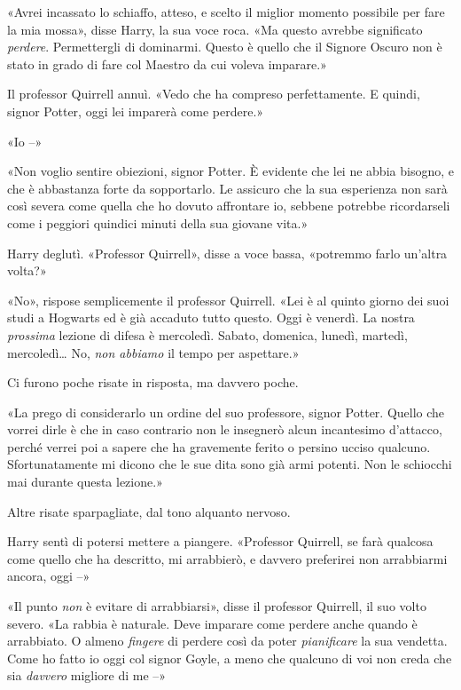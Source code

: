 «Avrei incassato lo schiaffo, atteso, e scelto il miglior momento possibile per fare la mia mossa», disse Harry, la sua voce roca. «Ma questo avrebbe significato \textit{perdere}. Permettergli di dominarmi. Questo è quello che il Signore Oscuro non è stato in grado di fare col Maestro da cui voleva imparare.»

Il professor Quirrell annuì. «Vedo che ha compreso perfettamente. E quindi, signor Potter, oggi lei imparerà come perdere.»

«Io –»

«Non voglio sentire obiezioni, signor Potter. È evidente che lei ne abbia bisogno, e che è abbastanza forte da sopportarlo. Le assicuro che la sua esperienza non sarà così severa come quella che ho dovuto affrontare io, sebbene potrebbe ricordarseli come i peggiori quindici minuti della sua giovane vita.»

Harry deglutì. «Professor Quirrell», disse a voce bassa, «potremmo farlo un’altra volta?»

«No», rispose semplicemente il professor Quirrell. «Lei è al quinto giorno dei suoi studi a Hogwarts ed è già accaduto tutto questo. Oggi è venerdì. La nostra \textit{prossima} lezione di difesa è mercoledì. Sabato, domenica, lunedì, martedì, mercoledì… No, \textit{non abbiamo} il tempo per aspettare.»

Ci furono poche risate in risposta, ma davvero poche.

«La prego di considerarlo un ordine del suo professore, signor Potter. Quello che vorrei dirle è che in caso contrario non le insegnerò alcun incantesimo d’attacco, perché verrei poi a sapere che ha gravemente ferito o persino ucciso qualcuno. Sfortunatamente mi dicono che le sue dita sono già armi potenti. Non le schiocchi mai durante questa lezione.»

Altre risate sparpagliate, dal tono alquanto nervoso.

Harry sentì di potersi mettere a piangere. «Professor Quirrell, se farà qualcosa come quello che ha descritto, mi arrabbierò, e davvero preferirei non arrabbiarmi ancora, oggi –»

«Il punto \textit{non} è evitare di arrabbiarsi», disse il professor Quirrell, il suo volto severo. «La rabbia è naturale. Deve imparare come perdere anche quando è arrabbiato. O almeno \textit{fingere} di perdere così da poter \textit{pianificare} la sua vendetta. Come ho fatto io oggi col signor Goyle, a meno che qualcuno di voi non creda che sia \textit{davvero} migliore di me –»

